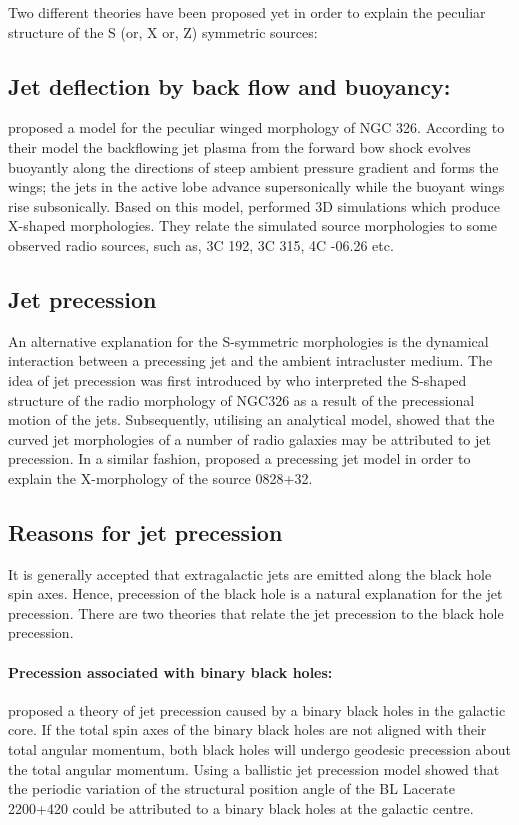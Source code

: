 Two different theories have been proposed yet in order to explain the peculiar structure of the S (or, X or, Z) symmetric sources:
\subsection{Jet deflection by back flow and buoyancy:}
 \citet{worrall95} proposed a model for the peculiar winged morphology of NGC 326. According to their model the backflowing jet plasma from the forward bow shock evolves buoyantly along the directions of steep ambient pressure gradient and forms the wings; the jets in the active lobe advance supersonically while the buoyant wings rise subsonically. Based on this model, \citet{hodges-kluck11} performed 3D simulations which produce X-shaped morphologies. They relate the simulated source morphologies to some observed radio sources, such as, 3C 192, 3C 315, 4C -06.26 etc. 
 
 \subsection{Jet precession}
 An alternative explanation for the S-symmetric morphologies is the dynamical interaction between a precessing jet and the ambient intracluster medium. The idea of jet precession was first introduced by \citet{ekers78} who interpreted the S-shaped structure of the radio morphology of NGC326 as a result of the precessional motion of the jets. Subsequently, utilising an analytical model, \citet{gower82} showed that the curved jet morphologies of a number of radio galaxies may be attributed to jet precession. In a similar fashion, \citep{klein95} proposed a precessing jet model in order to explain the X-morphology of the source 0828+32. 

\subsection{Reasons for jet precession}
It is generally accepted that extragalactic jets are emitted along the black hole spin axes. Hence, precession of the black hole is a natural explanation for the jet precession. There are two theories that relate the jet precession to the black hole precession. 

\paragraph{Precession associated with binary black holes:}
\citet{begelman80} proposed a theory of jet precession caused by a binary black holes in the galactic core.  If the total spin axes of the binary black holes are not aligned with their total angular momentum, both black holes will undergo geodesic precession about the total angular momentum. Using a ballistic jet precession model \citep{caproni13} showed that the periodic variation of the structural position angle of the BL Lacerate 2200+420 could be attributed to a binary black holes at the galactic centre. 


